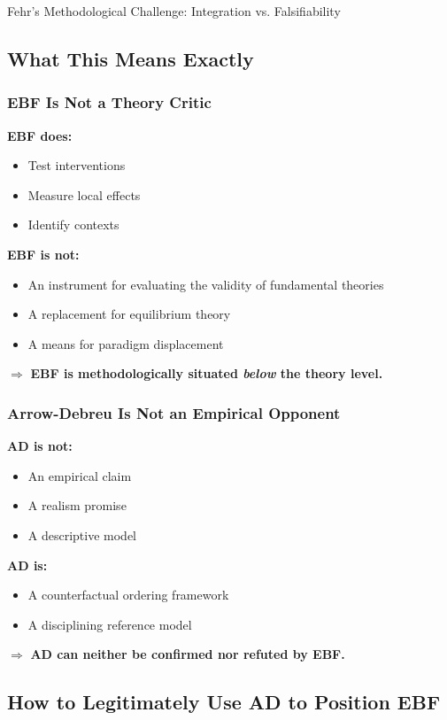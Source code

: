 \begin{chapter}{Fehr's Methodological Challenge: Integration vs. Falsifiability}
\subsection{What This Means Exactly}

\subsubsection{EBF Is Not a Theory Critic}

\textbf{EBF does:}
\begin{itemize}[noitemsep]
    \item Test interventions
    \item Measure local effects
    \item Identify contexts
\end{itemize}

\textbf{EBF is not:}
\begin{itemize}[noitemsep]
    \item An instrument for evaluating the validity of fundamental theories
    \item A replacement for equilibrium theory
    \item A means for paradigm displacement
\end{itemize}

$\Rightarrow$ \textbf{EBF is methodologically situated \textit{below} the theory level.}

\subsubsection{Arrow-Debreu Is Not an Empirical Opponent}

\textbf{AD is not:}
\begin{itemize}[noitemsep]
    \item An empirical claim
    \item A realism promise
    \item A descriptive model
\end{itemize}

\textbf{AD is:}
\begin{itemize}[noitemsep]
    \item A counterfactual ordering framework
    \item A disciplining reference model
\end{itemize}

$\Rightarrow$ \textbf{AD can neither be confirmed nor refuted by EBF.}

\subsection{How to Legitimately Use AD to Position EBF}


\end{chapter}
